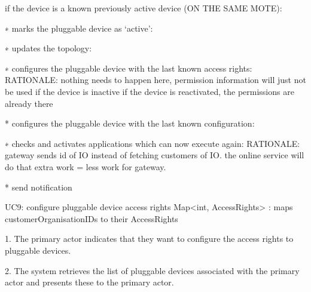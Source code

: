             if the device is a known previously active device (ON THE SAME MOTE):

                ∗ marks the pluggable device as ‘active’:

                ∗ updates the topology:

                ∗ configures the pluggable device with the last known access rights:
                    RATIONALE: nothing needs to happen here, permission information will just not be used if the device is inactive
                               if the device is reactivated, the permissions are already there

                * configures the pluggable device with the last known configuration:

                ∗ checks and activates applications which can now execute again:
                    RATIONALE: gateway sends id of IO instead of fetching customers of IO. the online service will do that extra work = less work for gateway.

                * send notification

        UC9: configure pluggable device access rights
            Map<int, AccessRights> : maps customerOrganisationIDs to their AccessRights

            1. The primary actor indicates that they want to configure the access rights to pluggable devices.

            2. The system retrieves the list of pluggable devices associated with the primary actor and presents these to the primary actor.

